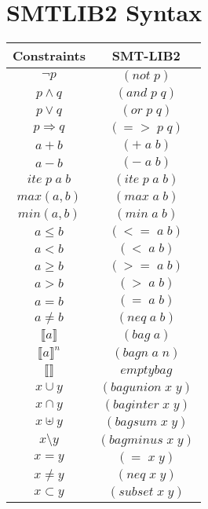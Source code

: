 \clearpage
\appendix





\section{SMTLIB2 Syntax}
\begin{center}
\begin{tabular}{|c|c|}
  \hline
  Constraints & SMT-LIB2\\
  \hline
  $\lnot p $ & $(not \;p)$ \\
  \hline
  $p\wedge q$ & $(and \;p \;q)$ \\
  \hline
  $p \vee q$ & $(or \;p \;q)$ \\
  \hline
  $p\Rightarrow q$ & $(=> \;p \;q)$ \\
  \hline
  $a+b$ & $(+\;a\;b)$ \\
  \hline
  $a-b$ & $(-\;a\;b)$ \\
  \hline
  $ite\; p\; a\; b$ & $(ite\;p\;a\;b)$ \\
  \hline
  $max(a,b)$ & $(max\;a\;b)$ \\
  \hline
  $min(a,b)$ & $(min\;a\;b)$ \\
  \hline
  $a\leq b$ & $(<= \;a\;b)$ \\
  \hline
  $a < b$ & $(< \;a\;b)$ \\
  \hline
  $a\geq b$ & $(>= \;a\;b)$ \\
  \hline
  $a > b$ & $(> \;a\;b)$ \\
  \hline
  $a = b$ & $(= \;a\;b)$ \\
  \hline
  $a\neq b$ & $(neq \;a\;b)$ \\
  \hline
  $\llbracket a \rrbracket$ & $(bag \;a)$ \\
  \hline
  $\llbracket a \rrbracket^{n}$ & $(bagn \;a \;n)$ \\
  \hline
  $\llbracket \rrbracket$ & $emptybag$ \\
  \hline
  $x \cup y$ & $(bagunion \;x \;y)$ \\
  \hline
  $x \cap y$ & $(baginter \;x \;y)$ \\
  \hline
  $x \uplus y$ & $(bagsum \;x \;y)$ \\
  \hline
  $x \setminus y$ & $(bagminus \;x \;y)$ \\
  \hline
  $x = y$ & $(= \;x \;y)$ \\
  \hline
  $x \neq y$ & $(neq \;x \;y)$ \\
  \hline
  $x \subset y$ & $(subset \;x \;y)$ \\

\end{tabular}
\end{center}
